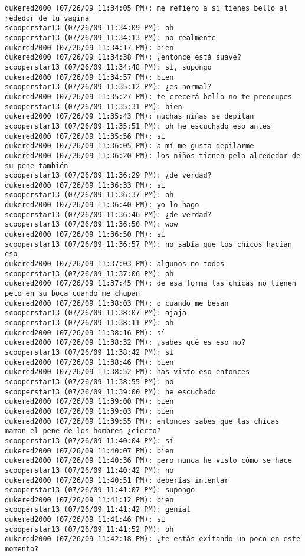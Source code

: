 \begin{verbatim}
dukered2000 (07/26/09 11:34:05 PM): me refiero a si tienes bello al rededor de tu vagina
scooperstar13 (07/26/09 11:34:09 PM): oh
scooperstar13 (07/26/09 11:34:13 PM): no realmente
dukered2000 (07/26/09 11:34:17 PM): bien
dukered2000 (07/26/09 11:34:38 PM): ¿entonce está suave?
scooperstar13 (07/26/09 11:34:48 PM): sí, supongo
dukered2000 (07/26/09 11:34:57 PM): bien
scooperstar13 (07/26/09 11:35:12 PM): ¿es normal?
dukered2000 (07/26/09 11:35:27 PM): te crecerá bello no te preocupes
scooperstar13 (07/26/09 11:35:31 PM): bien
dukered2000 (07/26/09 11:35:43 PM): muchas niñas se depilan
scooperstar13 (07/26/09 11:35:51 PM): oh he escuchado eso antes
dukered2000 (07/26/09 11:35:56 PM): sí
dukered2000 (07/26/09 11:36:05 PM): a mí me gusta depilarme
dukered2000 (07/26/09 11:36:20 PM): los niños tienen pelo alrededor de su pene también
scooperstar13 (07/26/09 11:36:29 PM): ¿de verdad?
dukered2000 (07/26/09 11:36:33 PM): sí
scooperstar13 (07/26/09 11:36:37 PM): oh
dukered2000 (07/26/09 11:36:40 PM): yo lo hago
scooperstar13 (07/26/09 11:36:46 PM): ¿de verdad?
scooperstar13 (07/26/09 11:36:50 PM): wow
dukered2000 (07/26/09 11:36:50 PM): sí
scooperstar13 (07/26/09 11:36:57 PM): no sabía que los chicos hacían eso 
dukered2000 (07/26/09 11:37:03 PM): algunos no todos
scooperstar13 (07/26/09 11:37:06 PM): oh
dukered2000 (07/26/09 11:37:45 PM): de esa forma las chicas no tienen pelo en su boca cuando me chupan
dukered2000 (07/26/09 11:38:03 PM): o cuando me besan
scooperstar13 (07/26/09 11:38:07 PM): ajaja
scooperstar13 (07/26/09 11:38:11 PM): oh
dukered2000 (07/26/09 11:38:16 PM): sí
dukered2000 (07/26/09 11:38:32 PM): ¿sabes qué es eso no?
scooperstar13 (07/26/09 11:38:42 PM): sí
dukered2000 (07/26/09 11:38:46 PM): bien
dukered2000 (07/26/09 11:38:52 PM): has visto eso entonces
scooperstar13 (07/26/09 11:38:55 PM): no
scooperstar13 (07/26/09 11:39:00 PM): he escuchado
dukered2000 (07/26/09 11:39:00 PM): bien
dukered2000 (07/26/09 11:39:03 PM): bien
dukered2000 (07/26/09 11:39:55 PM): entonces sabes que las chicas maman el pene de los hombres ¿cierto?
scooperstar13 (07/26/09 11:40:04 PM): sí
dukered2000 (07/26/09 11:40:07 PM): bien
dukered2000 (07/26/09 11:40:36 PM): pero nunca he visto cómo se hace
scooperstar13 (07/26/09 11:40:42 PM): no
dukered2000 (07/26/09 11:40:51 PM): deberías intentar
scooperstar13 (07/26/09 11:41:07 PM): supongo
dukered2000 (07/26/09 11:41:12 PM): bien
scooperstar13 (07/26/09 11:41:42 PM): genial
dukered2000 (07/26/09 11:41:46 PM): sí
scooperstar13 (07/26/09 11:41:52 PM): oh
dukered2000 (07/26/09 11:42:18 PM): ¿te estás exitando un poco en este momento?

\end{verbatim}
